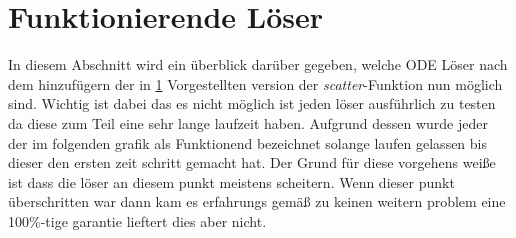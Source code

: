 \section{Funktionierende Löser}

In diesem Abschnitt wird ein überblick darüber gegeben, welche 
ODE Löser nach dem hinzufügern der in \ref{} Vorgestellten 
version der \textit{scatter}-Funktion nun möglich sind.
Wichtig ist dabei das es nicht möglich ist jeden löser ausführlich zu testen
da diese zum Teil eine sehr lange laufzeit haben.
Aufgrund dessen wurde jeder der im folgenden grafik als Funktionend 
bezeichnet solange laufen gelassen bis dieser den ersten zeit schritt gemacht hat.
Der Grund für diese vorgehens weiße ist dass die löser an diesem punkt meistens scheitern.
Wenn dieser punkt überschritten war dann kam es erfahrungs gemäß zu keinen 
weitern problem eine 100\%-tige garantie lieftert dies aber nicht.

    

